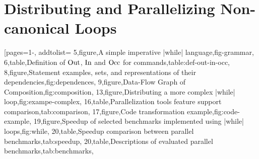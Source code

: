 \chapter{Distributing and Parallelizing Non-canonical Loops}
\label{app:sec:vmcai}
[pages={1-},
addtolist={
5,figure,A simple imperative \pr|while| language,fig-grammar,
6,table,{Definition of $\operatorname{Out}$, $\operatorname{In}$ and $\operatorname{Occ}$ for commands},table:def-out-in-occ,
8,figure,{Statement examples, sets, and representations of their dependencies},fig:dependences,
9,figure,Data-Flow Graph of Composition,fig:composition,
13,figure,Distributing a more complex \pr|while| loop,fig:exampe-complex,
16,table,Parallelization tools feature support comparison,tab:comparison,
17,figure,Code transformation example,fig:code-example,
19,figure,Speedup of selected benchmarks implemented using \pr|while| loops,fig:while,
20,table,Speedup comparison between parallel benchmarks,tab:speedup,
20,table,Descriptions of evaluated parallel benchmarks,tab:benchmarks},
